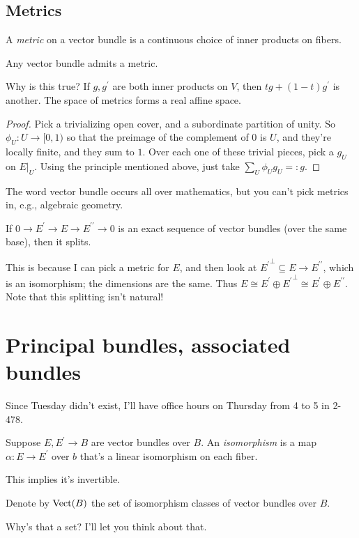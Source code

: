 \subsection{Metrics}
A \emph{metric} on a vector bundle is a continuous choice of inner products on fibers.
\begin{lemma}
    Any vector bundle admits a metric.
\end{lemma}
Why is this true? If $g,g^\prime$ are both inner products on $V$, then $tg+(1-t)g^\prime$ is another. The space of metrics forms a real affine space. 
\begin{proof}
    Pick a trivializing open cover, and a subordinate partition of unity. So $\phi_U:U\to [0,1)$ so that the preimage of the complement of $0$ is $U$, and they're locally finite, and they sum to $1$. Over each one of these trivial pieces, pick a $g_U$ on $E|_{U}$. Using the principle mentioned above, just take $\sum_{U}\phi_U g_U=:g$.
\end{proof}
The word vector bundle occurs all over mathematics, but you can't pick metrics in, e.g., algebraic geometry.
\begin{corollary}
    If $0\to E^\prime\to E\to E^{\prime\prime}\to 0$ is an exact sequence of vector bundles (over the same base), then it splits.
\end{corollary}
This is because I can pick a metric for $E$, and then look at ${E^\prime}^\perp\subseteq E\to E^{\prime\prime}$, which is an isomorphism; the dimensions are the same. Thus $E\cong E^\prime\oplus {E^\prime}^{\perp}\cong E^\prime\oplus E^{\prime\prime}$. Note that this splitting isn't natural!
\section{Principal bundles, associated bundles}
Since Tuesday didn't exist, I'll have office hours on Thursday from 4 to 5 in 2-478.
\begin{definition}
    Suppose $E,E^\prime\to B$ are vector bundles over $B$. An \emph{isomorphism} is a map $\alpha:E\to E^\prime$ over $b$ that's a linear isomorphism on each fiber.
\end{definition}
This implies it's invertible.
\begin{notation}
    Denote by $\operatorname{Vect}(B)$ the set of isomorphism classes of vector bundles over $B$.
\end{notation}
Why's that a set? I'll let you think about that.

